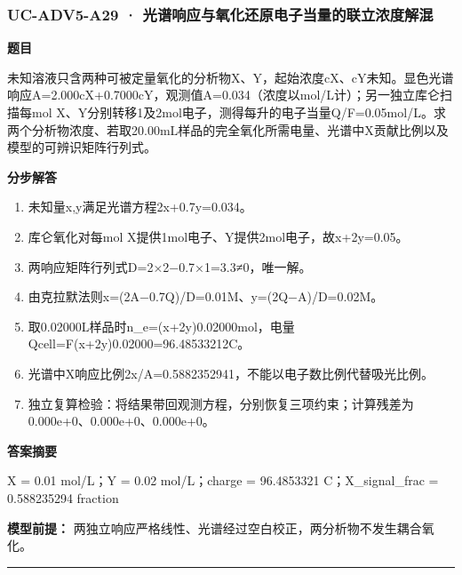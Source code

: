\documentclass[UTF8,11pt,a4paper]{ctexart}
\begin{document}
\subsubsection*{UC-ADV5-A29 · 光谱响应与氧化还原电子当量的联立浓度解混}
\noindent\textbf{题目}\par
未知溶液只含两种可被定量氧化的分析物X、Y，起始浓度cX、cY未知。显色光谱响应A=2.000cX+0.7000cY，观测值A=0.034（浓度以mol/L计）；另一独立库仑扫描每mol X、Y分别转移1及2mol电子，测得每升的电子当量Q/F=0.05mol/L。求两个分析物浓度、若取20.00mL样品的完全氧化所需电量、光谱中X贡献比例以及模型的可辨识矩阵行列式。\par
\medskip\noindent\textbf{分步解答}
\begin{enumerate}
\item 未知量x,y满足光谱方程2x+0.7y=0.034。
\item 库仑氧化对每mol X提供1mol电子、Y提供2mol电子，故x+2y=0.05。
\item 两响应矩阵行列式D=2×2−0.7×1=3.3≠0，唯一解。
\item 由克拉默法则x=(2A−0.7Q)/D=0.01M、y=(2Q−A)/D=0.02M。
\item 取0.02000L样品时n\_e=(x+2y)0.02000mol，电量Qcell=F(x+2y)0.02000=96.48533212C。
\item 光谱中X响应比例2x/A=0.5882352941，不能以电子数比例代替吸光比例。
\item 独立复算检验：将结果带回观测方程，分别恢复三项约束；计算残差为 0.000e+0、0.000e+0、0.000e+0。
\end{enumerate}
\noindent\textbf{答案摘要}\par
X = 0.01 mol/L；Y = 0.02 mol/L；charge = 96.4853321 C；X\_signal\_frac = 0.588235294 fraction\par
\noindent\textbf{模型前提：}
两独立响应严格线性、光谱经过空白校正，两分析物不发生耦合氧化。\par
\medskip\hrule\medskip
{}
\end{document}

